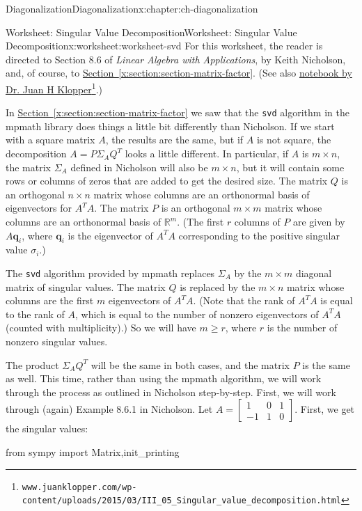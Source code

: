 \documentclass[oneside,10pt,]{book}
\newcommand{\xreffont}{\relax}
\newcommand{\mono}[1]{\texttt{#1}}
\numberwithin{equation}{section}
\newcommand{\bbm}{\begin{bmatrix}}
\newcommand{\ebm}{\end{bmatrix}}
\newcommand{\R}{\mathbb{R}}
\newcommand{\vecq}{\mathbf{q}}
\newcommand{\amp}{&}
\begin{document}
\begin{chapterptx}{Diagonalization}{}{Diagonalization}{}{}{x:chapter:ch-diagonalization}
\begin{worksheet-section}{Worksheet: Singular Value Decomposition}{}{Worksheet: Singular Value Decomposition}{}{}{x:worksheet:worksheet-svd}
For this worksheet, the reader is directed to Section 8.6 of \emph{Linear Algebra with Applications}, by Keith Nicholson, and, of course, to \hyperref[x:section:section-matrix-factor]{Section~{\xreffont\ref{x:section:section-matrix-factor}}}. (See also \href{https://www.juanklopper.com/wp-content/uploads/2015/03/III_05_Singular_value_decomposition.html}{notebook by Dr. Juan H Klopper}\footnote{\nolinkurl{www.juanklopper.com/wp-content/uploads/2015/03/III_05_Singular_value_decomposition.html}\label{g:fn:idp119}}.)%
\par
In \hyperref[x:section:section-matrix-factor]{Section~{\xreffont\ref{x:section:section-matrix-factor}}} we saw that the \mono{svd} algorithm in the mpmath library does things a little bit differently than Nicholson. If we start with a square matrix \(A\), the results are the same, but if \(A\) is not square, the decomposition \(A = P\Sigma_A Q^T\) looks a little different. In particular, if \(A\) is \(m\times n\), the matrix \(\Sigma_A\) defined in Nicholson will also be \(m\times n\), but it will contain some rows or columns of zeros that are added to get the desired size. The matrix \(Q\) is an orthogonal \(n\times n\) matrix whose columns are an orthonormal basis of eigenvectors for \(A^TA\). The matrix \(P\) is an orthogonal \(m\times m\) matrix whose columns are an orthonormal basis of \(\R^m\). (The first \(r\) columns of \(P\) are given by \(A\vecq_i\), where \(\vecq_i\) is the eigenvector of \(A^TA\) corresponding to the positive singular value \(\sigma_i\).)%
\par
The \mono{svd} algorithm provided by mpmath replaces \(\Sigma_A\) by the \(m\times m\) diagonal matrix of singular values. The matrix \(Q\) is replaced by the \(m\times n\) matrix whose columns are the first \(m\) eigenvectors of \(A^TA\). (Note that the rank of \(A^TA\) is equal to the rank of \(A\), which is equal to the number of nonzero eigenvectors of \(A^TA\) (counted with multiplicity).) So we will have \(m\geq r\), where \(r\) is the number of nonzero singular values.%
\par
The product \(\Sigma_A Q^T\) will be the same in both cases, and the matrix \(P\) is the same as well.%
This time, rather than using the mpmath algorithm, we will work through the process as outlined in Nicholson step-by-step. First, we will work through (again) Example 8.6.1 in Nicholson. Let \(A = \bbm 1\amp 0\amp 1\\-1\amp 1\amp 0\ebm\). First, we get the singular values:%
\begin{sageinput}
from sympy import Matrix,init_printing

\end{sageinput}
\end{worksheet-section}
\end{chapterptx}
\end{document}
